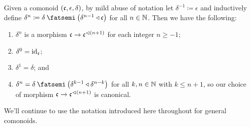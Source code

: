 \documentclass[Book-Poly]{subfiles}
\begin{document}
\begin{proposition} \label{prop.n_duplication}
Given a comonoid $(\mathfrak{c},\epsilon,\delta)$, by mild abuse of notation let $\delta^{-1}\coloneqq\epsilon$ and inductively define $\delta^n\coloneqq\delta\then\left(\delta^{n-1}\tri\ema{c}\right)$ for all $n\in\mathbb{N}$.
Then we have the following:
\begin{enumerate}[label=(\alph*)]
    \item $\delta^n$ is a morphism $\mathfrak{c}\to\mathfrak{c}^{\lhd (n+1)}$ for each integer $n\geq-1$;
    \item $\delta^0=\mathrm{id}_{\mathfrak{c}}$;
    \item $\delta^1=\delta$; and
    \item $\delta^n=\delta\then\left(\delta^{k-1}\tri\delta^{n-k}\right)$ for all $k,n\in\mathbb{N}$ with $k\leq n+1$, so our choice of morphism $\mathfrak{c}\to\mathfrak{c}^{\lhd (n+1)}$ is canonical.
\end{enumerate}
\end{proposition}


We'll continue to use the notation introduced here throughout for general comonoids.
\end{document}
